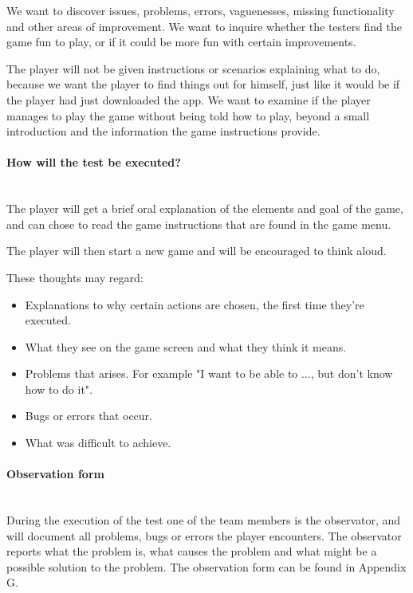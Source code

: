 		We want to discover issues, problems, errors, vaguenesses, missing functionality and other areas 
		of improvement. We want to inquire whether the testers find the game fun to play, or if it could 
		be more fun with certain improvements.

		The player will not be given instructions or scenarios explaining what to do, because we want 
		the player to find things out for himself, just like it would be if the player had just 
		downloaded the app. We want to examine if the player manages to play the game without being 
		told how to play, beyond a small introduction and the information the game instructions provide. 

	\paragraph{How will the test be executed?}\mbox{}\\

		The player will get a brief oral explanation of the elements and goal of the game, 
		and can chose to read the game instructions that are found in the game menu.

		The player will then start a new game and will be encouraged to think aloud. 

		These thoughts may regard:

		\begin{itemize}
		  \item Explanations to why certain actions are chosen, the first time they're executed.
		  \item What they see on the game screen and what they think it means.
		  \item Problems that arises. For example "I want to be able to ..., but don't know how to do it". 
		  \item Bugs or errors that occur.
		  \item What was difficult to achieve.
		\end{itemize}

	\paragraph{Observation form}\mbox{}\\

		During the execution of the test one of the team members is the observator, and will document all problems, bugs or errors the player encounters. The observator reports what the problem is, what causes the problem and what might be a possible solution to the problem. The observation form can be found in Appendix G.

